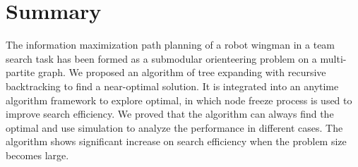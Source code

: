 \section{Summary}
\label{sec:summary}

The information maximization path planning of a robot wingman in a team search task has been formed as a submodular orienteering problem on a multi-partite graph.
We proposed an algorithm of tree expanding with recursive backtracking to find a near-optimal solution. 
It is integrated into an anytime algorithm framework to explore optimal, in which node freeze process is used to improve search efficiency.
We proved that the algorithm can always find the optimal and use simulation to analyze the performance in different cases.
The algorithm shows significant increase on search efficiency when the problem size becomes large.


